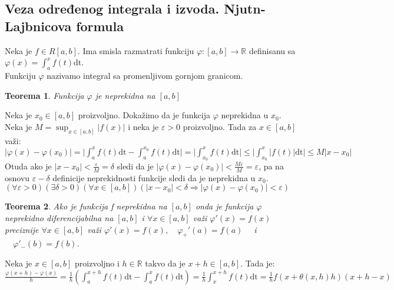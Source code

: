 \documentclass{article}
\newtheorem{teorema}{Teorema}[section]
\begin{document}
\subsection{Veza određenog integrala i izvoda. Njutn-Lajbnicova formula}
Neka je $f \in R[a, b]$. Ima smisla razmatrati funkciju $\varphi:[a, b] \rightarrow \mathbb{R}$ definisanu sa $\varphi (x) = \displaystyle \int^x_a f(t)\text{dt}$.\\
Funkciju $\varphi$ nazivamo integral sa promenljivom gornjom granicom.
\begin{teoremabox}
    \begin{teorema}
        Funkcija $\varphi$ je neprekidna na $[a, b]$
    \end{teorema}
\end{teoremabox}
Neka je $x_0 \in [a ,b]$ proizvoljno. Dokažimo da je funkcija $\varphi$ neprekidna u $x_0$. Neka je $M = \displaystyle \sup_{x\in[a,b]} | f(x) |$ i neka je $\varepsilon > 0$ proizvoljno. Tada za $x\in[a,b]$ važi:\\
$\displaystyle |\varphi(x) - \varphi(x_0)| = \bigg|\int^x_a f(t)\text{dt} - \int^{x_0}_a f(t)\text{dt}\bigg| = \bigg|\int^x_{x_0}f(t)\text{dt}\bigg| \leq \bigg|\int^x_{x_0}|f(t)|\text{dt}\bigg| \leq M|x - x_0|$\\
Otuda ako je $|x-x_0| < \frac{\varepsilon}{M} = \delta$ sledi da je $|\varphi(x) - \varphi(x_0)| < \frac{M\varepsilon}{M} = \varepsilon$, pa na osnovu $\varepsilon - \delta$ definicije neprekidnosti funkcije sledi da je neprekidna u $x_0$.\\
$\displaystyle (\forall \varepsilon > 0)(\exists \delta > 0)(\forall x\in [a, b])(|x-x_0| < \delta \Rightarrow |\varphi(x) - \varphi(x_0)| < \varepsilon)$
\begin{teoremabox}
    \begin{teorema}
        Ako je funkcija f neprekidna na $[a, b]$ onda je funkcija $\varphi$ neprekidno diferencijabilna na $[a, b]$ i $\forall x \in [a, b]$ važi $\varphi'(x) = f(x)$ preciznije $\forall x \in [a, b]$ važi $\varphi'(x) = f(x),\quad \varphi_+'(a) = f(a)\quad$ i $\quad \varphi'_-(b) = f(b)$.
    \end{teorema}
\end{teoremabox}
Neka je $x \in [a, b]$ proizvoljno i $h \in \mathbb{R}$ takvo da je $x+h\in[a,b]$. Tada  je:\\
$\frac{\varphi(x+h) - \varphi(x)}{h} = \frac{1}{h} (\displaystyle \int^{x+h}_a f(t)\text{dt} - \int^x_a f(t)\text{dt}) = \frac{1}{h} \int^{x+h}_x f(t)\text{dt} = \frac{1}{h} f(x+\theta(x,h)h)(x+h-x)$\\
\end{document}
